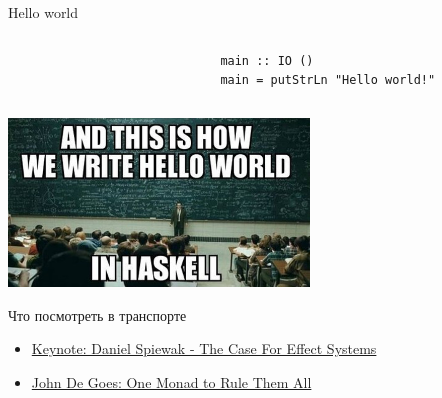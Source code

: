     \begin{frame}[fragile]{Hello world}
        \pause
        \vspace{-1em}
        \begin{columns}[onlytextwidth]
            \begin{column}[t]{0.3\textwidth}
            \end{column}\hfill%
            \begin{column}[t]{0.7\textwidth}
                \begin{verbatim}
                main :: IO ()
                main = putStrLn "Hello world!"
                \end{verbatim}
            \end{column}
        \end{columns}
        \pause
        \begin{center}
            \includegraphics[width=0.6\textwidth]{figs/hello_world}
        \end{center}
    \end{frame}


    \begin{frame}[fragile]{Что посмотреть в транспорте}
        \begin{itemize}
            \item \href{https://youtu.be/qgfCmQ-2tW0?si=9OBcKAlmGovWzSLp}{\color{blue}  Keynote: Daniel Spiewak - The Case For Effect Systems}
            \item \href{https://youtu.be/M0Fe2SRTm5c?si=34lMmVWtRjPg9OYj}{\color{blue} John De Goes: One Monad to Rule Them All }
        \end{itemize}
    \end{frame}

